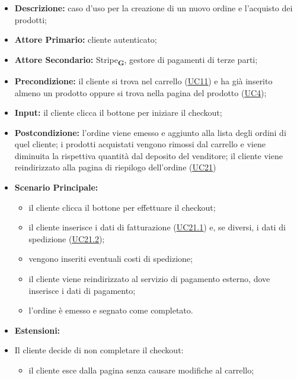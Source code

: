 \begin{itemize}
    \item \textbf{Descrizione:} caso d'uso per la creazione di un nuovo ordine e l'acquisto dei prodotti;
    \item \textbf{Attore Primario:} cliente autenticato;
    \item \textbf{Attore Secondario:} Stripe\textsubscript{\textbf{G}}, gestore di pagamenti di terze parti;
    \item \textbf{Precondizione:} il cliente si trova nel carrello (\hyperref[sec:UC11]{\underline{UC11}}) e ha già inserito almeno un prodotto oppure si trova nella pagina del prodotto (\hyperref[sec:UC4]{\underline{UC4}});
    \item \textbf{Input:} il cliente clicca il bottone per iniziare il checkout;
    \item \textbf{Postcondizione:} l'ordine viene emesso e aggiunto alla lista degli ordini di quel cliente; i prodotti acquistati vengono rimossi dal carrello e viene diminuita la rispettiva quantità dal deposito del venditore; il cliente viene reindirizzato alla pagina di riepilogo dell'ordine (\hyperref[sec:UC21]{\underline{UC21}})
    \item \textbf{Scenario Principale:}
          \begin{itemize}
              \item il cliente clicca il bottone per effettuare il checkout;
              \item il cliente inserisce i dati di fatturazione (\hyperref[sec:UC21.1]{\underline{UC21.1}}) e, se diversi, i dati di spedizione (\hyperref[sec:UC21.2]{\underline{UC21.2}});
              \item vengono inseriti eventuali costi di spedizione;
              \item il cliente viene reindirizzato al servizio di pagamento esterno, dove inserisce i dati di pagamento;
              \item l'ordine è emesso e segnato come completato.
          \end{itemize}
    \item \textbf{Estensioni:}
    \item Il cliente decide di non completare il checkout:
          \begin{itemize}
              \item  il cliente esce dalla pagina senza causare modifiche al carrello;
          \end{itemize}
\end{itemize}

